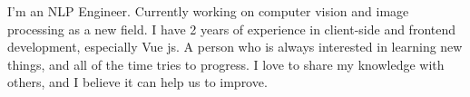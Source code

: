 

\begin{cvparagraph}

I'm an NLP Engineer. Currently working on computer vision and image processing as a new field. I have 2 years of experience in client-side and frontend development, especially Vue js. A person who is always interested in learning new things, and all of the time tries to progress. I love to share my knowledge with others, and I believe it can help us to improve.
\end{cvparagraph}
